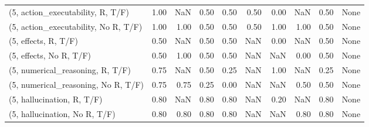 \begin{table*}[h!]
\begin{adjustbox}{width=2\columnwidth,center}
\begin{tabular}{lrrr|rrr|rrr}
(5, action\_executability, R, T/F)    &                      1.00 &                   NaN &                      0.50 &                          0.50 &                      0.50 &                          0.00 &                                    NaN &                               0.50 &                                  None \\
(5, action\_executability, No R, T/F) &                      1.00 &                  1.00 &                      0.50 &                          0.50 &                      0.50 &                          1.00 &                                   1.00 &                               0.50 &                                  None \\
(5, effects, R, T/F)                 &                      0.50 &                   NaN &                      0.50 &                          0.50 &                       NaN &                          0.00 &                                    NaN &                               0.50 &                                  None \\
(5, effects, No R, T/F)              &                      0.50 &                  1.00 &                      0.50 &                          0.50 &                       NaN &                           NaN &                                   0.00 &                               0.50 &                                  None \\
(5, numerical\_reasoning, R, T/F)     &                      0.75 &                   NaN &                      0.50 &                          0.25 &                       NaN &                          1.00 &                                    NaN &                               0.25 &                                  None \\
(5, numerical\_reasoning, No R, T/F)  &                      0.75 &                  0.75 &                      0.25 &                          0.00 &                       NaN &                           NaN &                                   0.50 &                               0.50 &                                  None \\
(5, hallucination, R, T/F)           &                      0.80 &                   NaN &                      0.80 &                          0.80 &                       NaN &                          0.20 &                                    NaN &                               0.80 &                                  None \\
(5, hallucination, No R, T/F)        &                      0.80 &                  0.80 &                      0.80 &                          0.80 &                       NaN &                           NaN &                                   0.80 &                               0.80 &                                  None \\

\end{tabular}
\end{adjustbox}
\end{table*}
